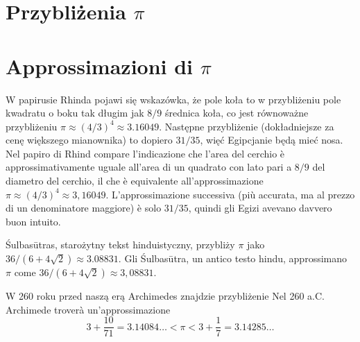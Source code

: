 
%

\section{Przybliżenia $\pi$} %
\section{Approssimazioni di $\pi$} %
\label{sekcja_przyblizenia_pi}%

W papirusie Rhinda pojawi się wskazówka, że pole koła to w przybliżeniu pole kwadratu o boku tak długim jak $8/9$ średnica koła, co jest równoważne przybliżeniu $\pi \approx (4/3)^4 \approx 3.16049$. %
Następne przybliżenie (dokładniejsze za cenę większego mianownika) to dopiero $31/35$, więć Egipcjanie będą mieć nosa. %
Nel papiro di Rhind compare l'indicazione che l'area del cerchio è approssimativamente uguale all’area di un quadrato con lato pari a $8/9$ del diametro del cerchio, il che è equivalente all’approssimazione $\pi \approx (4/3)^4 \approx 3{,}16049$. %
L'approssimazione successiva (più accurata, ma al prezzo di un denominatore maggiore) è solo $31/35$, quindi gli Egizi avevano davvero buon intuito. %

Śulbasūtras, starożytny tekst hinduistyczny, przybliży $\pi$ jako $36 / (6 + 4 \sqrt 2) \approx 3.08831$. %
Gli Śulbasūtra, un antico testo hindu, approssimano $\pi$ come $36 / (6 + 4 \sqrt{2}) \approx 3{,}08831$. %

W 260 roku przed naszą erą Archimedes znajdzie przybliżenie %
Nel 260 a.C. Archimede troverà un'approssimazione %
\begin{equation}
    3 + \frac{10}{71} = 3.14084 \ldots < \pi < 3 + \frac 1 7 = 3.14285 \ldots
\end{equation}

